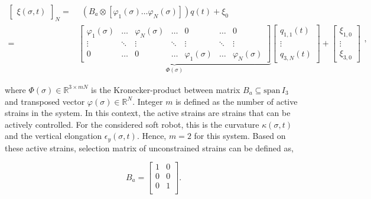 \begin{equation}
\begin{aligned}
    \begin{bmatrix}\xi(\sigma,t)\end{bmatrix}_N = & \hspace{5pt}  (B_a \otimes [ \varphi_1(\sigma) \dots \varphi_N(\sigma) ])q(t) + \xi_0 \\ = &  \underbrace{ \begin{bmatrix}
    \varphi_1(\sigma) & \dots  & \varphi_N(\sigma) & \dots     & 0      & \dots  &  0 \\
    \vdots    & \ddots & \vdots    & \ddots    & \vdots & \ddots & \vdots \\
    0         & \dots  & 0         & \dots     & \varphi_1(\sigma) & \dots & \varphi_N (\sigma)
    \end{bmatrix}}_{\Phi(\sigma)} \begin{bmatrix} q_{1,1}(t) \\ \vdots \\ q_{3,N}(t) \end{bmatrix} +  \begin{bmatrix} \xi_{1,0} \\ \vdots \\ \xi_{3,0}   \end{bmatrix}
    \end{aligned},
\label{eq2:xishape}
\end{equation}

where $\Phi(\sigma) \in \mathbb{R}^{3 \times mN}$ is the Kronecker-product between matrix $B_a \subseteq \text{span} \hspace{2pt} I_3$ and transposed vector $\varphi(\sigma) \in \mathbb{R}^N$. Integer $m$ is defined as the number of active strains in the system. In this context, the active strains are strains that can be actively controlled. For the considered soft robot, this is the curvature $\kappa(\sigma,t)$ and the vertical elongation $\epsilon_y(\sigma,t)$. Hence, $m=2$ for this system. Based on these active strains, selection matrix of unconstrained strains can be defined as,

\begin{equation}
    B_a = \begin{bmatrix}
    1 & 0 \\
    0 & 0  \\
    0 & 1  \\
    \end{bmatrix}.
    \label{eq2:Ba}
\end{equation}

